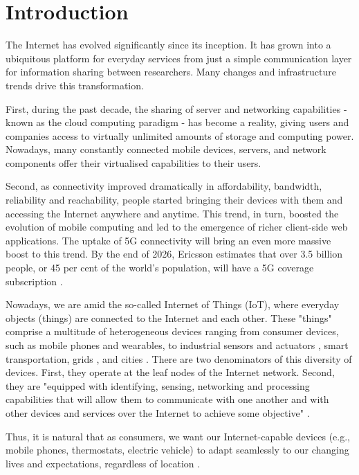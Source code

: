 \section{Introduction}
\label{sec:introduction}

The Internet has evolved significantly since its inception. It has grown into a ubiquitous platform for everyday services from just a simple communication layer for information sharing between researchers. Many changes and infrastructure trends drive this transformation.

First, during the past decade, the sharing of server and networking capabilities - known as the cloud computing paradigm - has become a reality, giving users and companies access to virtually unlimited amounts of storage and computing power. Nowadays, many constantly connected mobile devices, servers, and network components offer their virtualised capabilities to their users.

Second, as connectivity improved dramatically in affordability, bandwidth, reliability and reachability, people started bringing their devices with them and accessing the Internet anywhere and anytime. This trend, in turn, boosted the evolution of mobile computing and led to the emergence of richer client-side web applications. The uptake of 5G connectivity will bring an even more massive boost to this trend. By the end of 2026, Ericsson estimates that over 3.5 billion people, or 45 per cent of the world's population, will have a 5G coverage subscription \cite{ericsson-5g}.

Nowadays, we are amid the so-called Internet of Things (IoT), where everyday objects (things) are connected to the Internet and each other. These "things" comprise a multitude of heterogeneous devices ranging from consumer devices, such as mobile phones and wearables, to industrial sensors and actuators \cite{chen2018edge}, smart transportation, grids \cite{mugarza2019dynamic}, and cities \cite{mitton2012combining}. There are two denominators of this diversity of devices. First, they operate at the leaf nodes of the Internet network. Second, they are "equipped with identifying, sensing, networking and processing capabilities that will allow them to communicate with one another and with other devices and services over the Internet to achieve some objective" \cite{whitmore2015internet}.

Thus, it is natural that as consumers, we want our Internet-capable devices (e.g., mobile phones, thermostats, electric vehicle) to adapt seamlessly to our changing lives and expectations, regardless of location \cite{beckman2020harnessing}.

